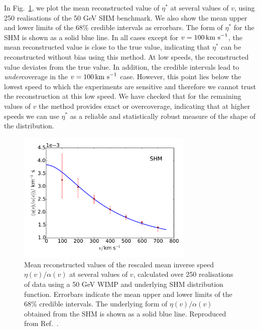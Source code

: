 In Fig.~\ref{fig:Poly:eta_stats}, we plot the mean reconstructed value of $\eta^*$ at several values of $v$, using 250 realisations of the 50 GeV SHM benchmark. We also show the mean upper and lower limits of the 68\% credible intervals as errorbars. The form of $\eta^*$ for the SHM is shown as a solid blue line. In all cases except for $v=100 \,\textrm{km s}^{-1}$, the mean reconstructed value is close to the true value, indicating that $\eta^*$ can be reconstructed without bias using this method. At low speeds, the reconstructed value deviates from the true value. In addition, the credible intervals lead to \textit{under}coverage in the $v=100 \,\textrm{km s}^{-1}$ case. However, this point lies below the lowest speed to which the experiments are sensitive and therefore we cannot trust the reconstruction at this low speed. We have checked that for the remaining values of $v$ the method provides exact or overcoverage, indicating that at higher speeds we can use $\eta^*$ as a reliable and statistically robust measure of the shape of the distribution.

\begin{figure}[t]
\centering
  \includegraphics[width=0.75\textwidth]{Poly/Eta.pdf}
  \caption[Mean reconstructed values of the rescaled mean inverse speed over 250 realisations for a 50 GeV WIMP with SHM distribution function]{Mean reconstructed values of the rescaled mean inverse speed $\eta(v)/\alpha(v)$ at several values of $v$, calculated over 250 realisations of data using a 50 GeV WIMP and underlying SHM distribution function. Errorbars indicate the mean upper and lower limits of the 68\% credible intervals. The underlying form of $\eta(v)/\alpha(v)$ obtained from the SHM is shown as a solid blue line. Reproduced from Ref.~\cite{Kavanagh:2014}.}
  \label{fig:Poly:eta_stats}
\end{figure}


